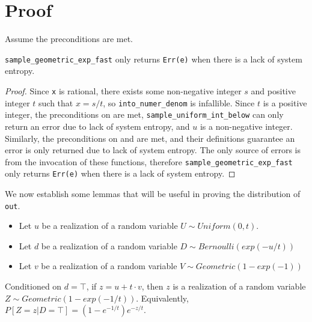 \documentclass{article}
\begin{document}
\section{Proof}
Assume the preconditions are met.

\begin{lemma}\label{err-e}
    \texttt{sample\_geometric\_exp\_fast} only returns \texttt{Err(e)} when there is a lack of system entropy.
\end{lemma}

\begin{proof}
    Since \texttt{x} is rational, there exists some non-negative integer $s$ and positive integer $t$ such that $x = s/t$,
    so \texttt{into\_numer\_denom} is infallible.
    Since $t$ is a positive integer, the preconditions on  are met, 
    \texttt{sample\_uniform\_int\_below} can only return an error due to lack of system entropy, and $u$ is a non-negative integer.
    Similarly, the preconditions on  and  are met,
    and their definitions guarantee an error is only returned due to lack of system entropy.
    The only source of errors is from the invocation of these functions,
    therefore \texttt{sample\_geometric\_exp\_fast} only returns \texttt{Err(e)} when there is a lack of system entropy.
\end{proof}

We now establish some lemmas that will be useful in proving the distribution of \texttt{out}.

\begin{itemize}
    \item Let $u$ be a realization of a random variable $U \sim Uniform(0, t)$.
    \item Let $d$ be a realization of a random variable $D \sim Bernoulli(exp(-u/t))$
    \item Let $v$ be a realization of a random variable $V \sim Geometric(1 - exp(-1))$
\end{itemize}

\begin{lemma}\label{geom_1_t}\cite{CKS20}
    Conditioned on $d = \top$, if $z = u + t \cdot v$, 
    then $z$ is a realization of a random variable $Z \sim Geometric(1 - exp(-1/t))$. 
    Equivalently, $P[Z=z | D=\top] = (1 - e^{-1/t}) e^{-z/t}$.
\end{lemma}
\end{document}
